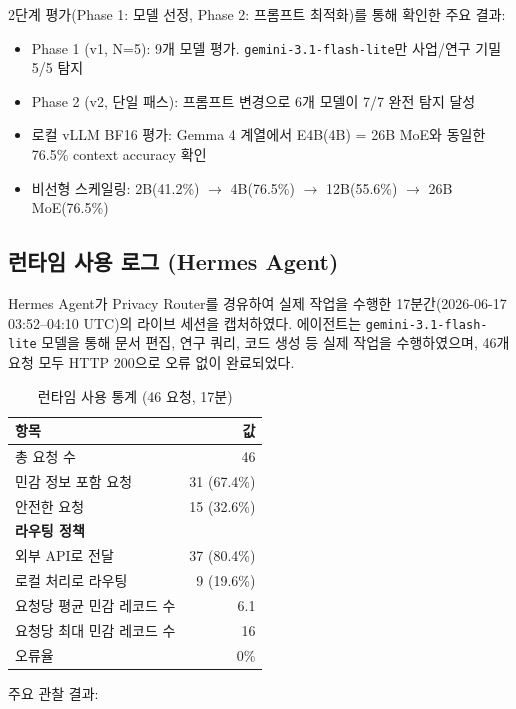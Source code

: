 \documentclass[11pt,a4paper]{article}
\begin{document}
2단계 평가(Phase 1: 모델 선정, Phase 2: 프롬프트 최적화)를 통해 확인한 주요 결과:

\begin{itemize}[nosep]
  \item Phase 1 (v1, N=5): 9개 모델 평가. \texttt{gemini-3.1-flash-lite}만 사업/연구 기밀 5/5 탐지
  \item Phase 2 (v2, 단일 패스): 프롬프트 변경으로 6개 모델이 7/7 완전 탐지 달성
  \item 로컬 vLLM BF16 평가: Gemma 4 계열에서 E4B(4B) = 26B MoE와 동일한 76.5\% context accuracy 확인
  \item 비선형 스케일링: 2B(41.2\%) $\rightarrow$ 4B(76.5\%) $\rightarrow$ 12B(55.6\%) $\rightarrow$ 26B MoE(76.5\%)
\end{itemize}

\subsection{런타임 사용 로그 (Hermes Agent)}

Hermes Agent가 Privacy Router를 경유하여 실제 작업을 수행한 17분간(2026-06-17 03:52--04:10 UTC)의 라이브 세션을 캡처하였다. 에이전트는 \texttt{gemini-3.1-flash-lite} 모델을 통해 문서 편집, 연구 쿼리, 코드 생성 등 실제 작업을 수행하였으며, 46개 요청 모두 HTTP 200으로 오류 없이 완료되었다.

\begin{table}[h]
\centering
\begin{tabular}{@{}lr@{}}
\toprule
항목 & 값 \\
\midrule
총 요청 수 & 46 \\
민감 정보 포함 요청 & 31 (67.4\%) \\
안전한 요청 & 15 (32.6\%) \\
\midrule
\multicolumn{2}{l}{\textbf{라우팅 정책}} \\
\quad 외부 API로 전달 & 37 (80.4\%) \\
\quad 로컬 처리로 라우팅 & 9 (19.6\%) \\
\midrule
요청당 평균 민감 레코드 수 & 6.1 \\
요청당 최대 민감 레코드 수 & 16 \\
오류율 & 0\% \\
\bottomrule
\end{tabular}
\caption{런타임 사용 통계 (46 요청, 17분)}
\end{table}

주요 관찰 결과:
\end{document}
